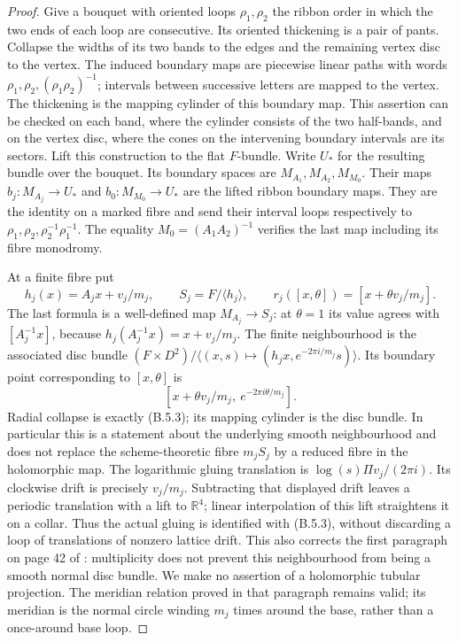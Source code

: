\begin{proof}
Give a bouquet with oriented loops $\rho_1,\rho_2$ the ribbon
order in which the two ends of each loop are consecutive.
Its oriented thickening is a pair of pants.  Collapse the
widths of its two bands to the edges and the remaining
vertex disc to the vertex.  The induced boundary maps are
piecewise linear paths with words
$\rho_1,\rho_2,(\rho_1\rho_2)^{-1}$; intervals between
successive letters are mapped to the vertex.  The thickening
is the mapping cylinder of this boundary map.  This assertion
can be checked on each band, where the cylinder consists of
the two half-bands, and on the vertex disc, where the cones
on the intervening boundary intervals are its sectors.
Lift this construction to the flat $F$-bundle.  Write $U_*$
for the resulting bundle over the bouquet.  Its boundary
spaces are $M_{A_1},M_{A_2},M_{M_0}$.  Their maps
$b_j:M_{A_j}\to U_*$ and $b_0:M_{M_0}\to U_*$ are the
lifted ribbon boundary maps.  They are the identity on a
marked fibre and send their interval loops respectively to
$\rho_1,\rho_2,\rho_2^{-1}\rho_1^{-1}$.
The equality $M_0=(A_1A_2)^{-1}$ verifies the last map
including its fibre monodromy.

At a finite fibre put
\[
 h_j(x)=A_jx+v_j/m_j,\qquad S_j=F/\langle h_j\rangle,
 \qquad
 r_j([x,\theta])=[x+\theta v_j/m_j].
 \tag{B.5.3}
\]
The last formula is a well-defined map $M_{A_j}\to S_j$:
at $\theta=1$ its value agrees with $[A_j^{-1}x]$, because
$h_j(A_j^{-1}x)=x+v_j/m_j$.  The finite neighbourhood is
the associated disc bundle
$(F\times D^2)/\langle(x,s)\mapsto(h_jx,e^{-2\pi i/m_j}s)\rangle$.
Its boundary point corresponding to $[x,\theta]$ is
\[
 [x+\theta v_j/m_j,\ e^{-2\pi i\theta/m_j}].
\]
Radial collapse is exactly (B.5.3); its mapping cylinder is
the disc bundle.  In particular this is a statement about
the underlying smooth neighbourhood and does not replace
the scheme-theoretic fibre $m_jS_j$ by a reduced fibre in
the holomorphic map.  The logarithmic gluing translation is
$\log(s)\Pi v_j/(2\pi i)$.  Its clockwise drift is precisely
$v_j/m_j$.  Subtracting that displayed drift leaves a
periodic translation with a lift to $\mathbb R^4$; linear
interpolation of this lift straightens it on a collar.
Thus the actual gluing is identified with (B.5.3), without
discarding a loop of translations of nonzero lattice drift.
This also corrects the first paragraph on page 42 of
\cite{mapsAC26}: multiplicity does not prevent this
neighbourhood from being a smooth normal disc bundle.
We make no assertion of a holomorphic tubular projection.
The meridian relation proved in that paragraph remains
valid; its meridian is the normal circle winding $m_j$
times around the base, rather than a once-around base
loop.


\end{proof}
